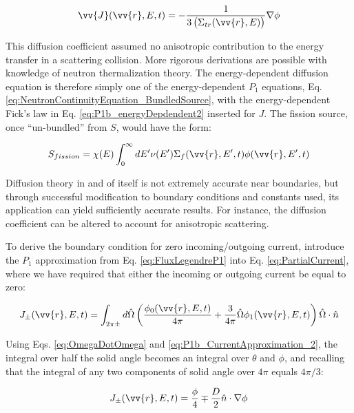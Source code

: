 \documentclass[10pt]{article}
\begin{document}
\begin{flushleft}
\begin{equation}
\label{eq:P1b_energyDepdendent2}
\vv{J}(\vv{r}, E, t) = -\frac{1}{3\left(\Sigma_{tr}(\vv{r},E)\right)}\nabla\phi
\end{equation}

This diffusion coefficient assumed no anisotropic contribution to the energy transfer in a scattering collision. More rigorous derivations are possible with knowledge of neutron thermalization theory. The energy-dependent diffusion equation is therefore simply one of the energy-dependent \(P_1\) equations, Eq. \ref{eq:NeutronContinuityEquation_BundledSource}, with the energy-dependent Fick's law in Eq. \ref{eq:P1b_energyDepdendent2} inserted for \(J\). The fission source, once ``un-bundled'' from \(S\), would have the form:

\begin{equation}
\label{eq:FissionSource}
S_{fission}=\chi(E)\int_{0}^{\infty}dE'\nu(E')\Sigma_f(\vv{r}, E', t)\phi(\vv{r}, E', t)
\end{equation}

Diffusion theory in and of itself is not extremely accurate near boundaries, but through successful modification to boundary conditions and constants used, its application can yield sufficiently accurate results. For instance, the diffusion coefficient can be altered to account for anisotropic scattering. 

To derive the boundary condition for zero incoming/outgoing current, introduce the \(P_1\) approximation from Eq. \ref{eq:FluxLegendreP1} into Eq. \ref{eq:PartialCurrent}, where we have required that either the incoming or outgoing current be equal to zero:

\begin{equation}
\label{eq:PartialCurrent_BC1}
J_\pm (\vv{r}, E, t) = \int_{2\pi\pm}^{} d\hat{\Omega} \left(\frac{\phi_0(\vv{r}, E, t)}{4\pi} + \frac{3}{4\pi} \hat{\Omega}\phi_1(\vv{r}, E, t)\right)\hat{\Omega}\cdot\hat{n}
\end{equation}

Using Eqs. \ref{eq:OmegaDotOmega} and \ref{eq:P1b_CurrentApproximation_2}, the integral over half the solid angle becomes an integral over \(\theta\) and \(\phi\), and recalling that the integral of any two components of solid angle over \(4\pi\) equals \(4\pi/3\):

\begin{equation}
\label{eq:PartialCurrent_BC2}
J_\pm (\vv{r}, E, t) = \frac{\phi}{4} \mp \frac{D}{2}\hat{n}\cdot\nabla\phi
\end{equation}


\end{flushleft}
\end{document}
